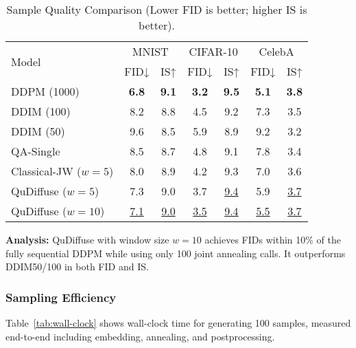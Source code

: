 \documentclass[11pt,letterpaper]{article}
\begin{document}
\begin{table}[H]
\centering
\caption{Sample Quality Comparison (Lower FID is better; higher IS is better).}
\label{tab:sample-quality}
\begin{tabular}{lcccccc}
\toprule
\multirow{2}{*}{Model} & \multicolumn{2}{c}{MNIST} & \multicolumn{2}{c}{CIFAR-10} & \multicolumn{2}{c}{CelebA} \\
\cmidrule(lr){2-3} \cmidrule(lr){4-5} \cmidrule(lr){6-7}
 & FID↓ & IS↑ & FID↓ & IS↑ & FID↓ & IS↑ \\
\midrule
DDPM (1000) & \textbf{6.8} & \textbf{9.1} & \textbf{3.2} & \textbf{9.5} & \textbf{5.1} & \textbf{3.8} \\
DDIM (100)  & 8.2 & 8.8 & 4.5 & 9.2 & 7.3 & 3.5 \\
DDIM (50)   & 9.6 & 8.5 & 5.9 & 8.9 & 9.2 & 3.2 \\
QA-Single   & 8.5 & 8.7 & 4.8 & 9.1 & 7.8 & 3.4 \\
Classical-JW ($w=5$) & 8.0 & 8.9 & 4.2 & 9.3 & 7.0 & 3.6 \\
QuDiffuse ($w=5$)    & 7.3 & 9.0 & 3.7 & \underline{9.4} & 5.9 & \underline{3.7} \\
QuDiffuse ($w=10$)   & \underline{7.1} & \underline{9.0} & \underline{3.5} & \underline{9.4} & \underline{5.5} & \underline{3.7} \\
\bottomrule
\end{tabular}
\end{table}

\noindent\textbf{Analysis:} QuDiffuse with window size $w=10$ achieves FIDs within 10\% of the fully sequential DDPM while using only 100 joint annealing calls. It outperforms DDIM50/100 in both FID and IS.

\subsubsection{Sampling Efficiency}
Table~\ref{tab:wall-clock} shows wall-clock time for generating 100 samples, measured end-to-end including embedding, annealing, and postprocessing.
\end{document}
